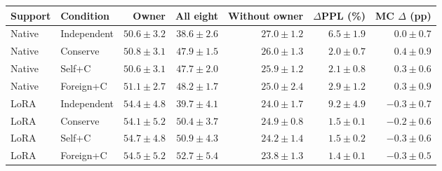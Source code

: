 \begin{tabular}{@{}llrrrrr@{}}
\toprule
Support & Condition & Owner & All eight & Without owner & $\Delta$PPL (\%) & MC $\Delta$ (pp)\\
\midrule
Native & Independent & $50.6 \pm 3.2$ & $38.6 \pm 2.6$ & $27.0 \pm 1.2$ & $6.5 \pm 1.9$ & $0.0 \pm 0.7$\\
Native & Conserve & $50.8 \pm 3.1$ & $47.9 \pm 1.5$ & $26.0 \pm 1.3$ & $2.0 \pm 0.7$ & $0.4 \pm 0.9$\\
Native & Self+C & $50.6 \pm 3.1$ & $47.7 \pm 2.0$ & $25.9 \pm 1.2$ & $2.1 \pm 0.8$ & $0.3 \pm 0.6$\\
Native & Foreign+C & $51.1 \pm 2.7$ & $48.2 \pm 1.7$ & $25.0 \pm 2.4$ & $2.9 \pm 1.2$ & $0.3 \pm 0.9$\\
\midrule
LoRA & Independent & $54.4 \pm 4.8$ & $39.7 \pm 4.1$ & $24.0 \pm 1.7$ & $9.2 \pm 4.9$ & $-0.3 \pm 0.7$\\
LoRA & Conserve & $54.1 \pm 5.2$ & $50.4 \pm 3.7$ & $24.9 \pm 0.8$ & $1.5 \pm 0.1$ & $-0.2 \pm 0.6$\\
LoRA & Self+C & $54.7 \pm 4.8$ & $50.9 \pm 4.3$ & $24.2 \pm 1.4$ & $1.5 \pm 0.2$ & $-0.3 \pm 0.6$\\
LoRA & Foreign+C & $54.5 \pm 5.2$ & $52.7 \pm 5.4$ & $23.8 \pm 1.3$ & $1.4 \pm 0.1$ & $-0.3 \pm 0.5$\\
\bottomrule
\end{tabular}
